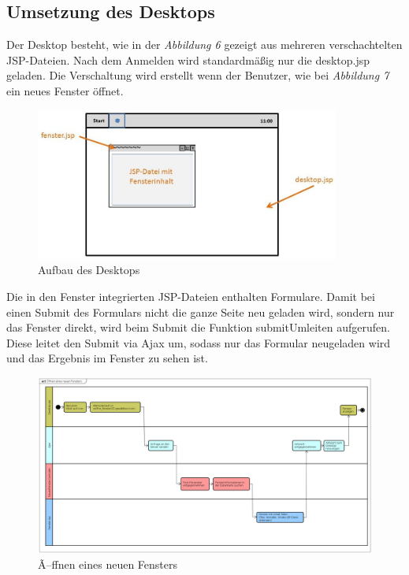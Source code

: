 \documentclass[12pt, a4paper]{article}
\begin{document}
\subsection{Umsetzung des Desktops}
Der Desktop besteht, wie in der \textit{Abbildung 6} gezeigt aus mehreren verschachtelten JSP-Dateien. Nach dem Anmelden wird standardmäßig nur die \glqq desktop.jsp\grqq{} geladen. Die Verschaltung wird erstellt wenn der Benutzer, wie bei \textit{Abbildung 7} ein neues Fenster öffnet.

\begin{figure}[H]
	\begin{center}
		\includegraphics[width=100mm]{Bilder/desktop.jpg}
	\end{center}
	\caption{Aufbau des Desktops}
\end{figure}

Die in den Fenster integrierten JSP-Dateien enthalten Formulare. Damit bei einen Submit des Formulars nicht die ganze Seite neu geladen wird, sondern nur das Fenster direkt, wird beim Submit die Funktion \glqq submitUmleiten\grqq{} aufgerufen. Diese leitet den Submit via Ajax um, sodass nur das Formular neugeladen wird und das Ergebnis im Fenster zu sehen ist.


\begin{figure}[H]
	\begin{center}
		\includegraphics[width=220mm,angle=90]{Bilder/fenster_oeffnen.png}
	\end{center}
	\caption{Ã–ffnen eines neuen Fensters}
\end{figure}
\end{document}
